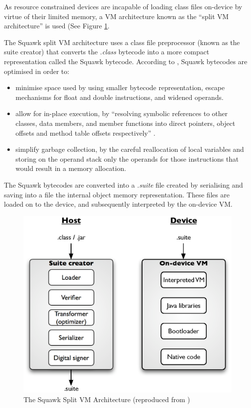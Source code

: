 As resource constrained devices are incapable of loading class files on-device
by virtue of their limited memory, a VM architecture known as the ``split VM
architecture'' is used (See Figure \ref{Fig:SquawkVM_architecture}. 

The Squawk split VM architecture uses a class file preprocessor (known as the
suite creator) that converts the \emph{.class} bytecode into a more compact
representation called the Squawk bytecode. According to
\cite{simon_squawk:2006}, Squawk bytecodes are optimised in order to:
\begin{itemize}
\item minimise space used by using smaller bytecode representation, escape
mechanisms for float and double instructions, and widened operands. 
\item allow for in-place execution, by ``resolving symbolic references to other
classes, data members, and member functions into direct pointers, object offsets
and method table offsets respectively'' \cite{simon_squawk:2006}.
\item simplify garbage collection, by the careful reallocation of local
variables and storing on the operand stack only the operands for those
instructions that would result in a memory allocation.
\end{itemize}

The Squawk bytecodes are converted into a \emph{.suite} file created by
serialising and saving into a file the internal object memory representation.
These files are loaded on to the device, and subsequently interpreted by the
on-device VM.
  
\begin{figure}
\centering
\includegraphics[scale=0.61]{img/Squawk_architecture.eps} 
\caption[The Squawk Split VM Architecture]{The Squawk
Split VM Architecture (reproduced from \cite{simon_squawk:2006})}
\label{Fig:SquawkVM_architecture}
\end{figure}   
  

